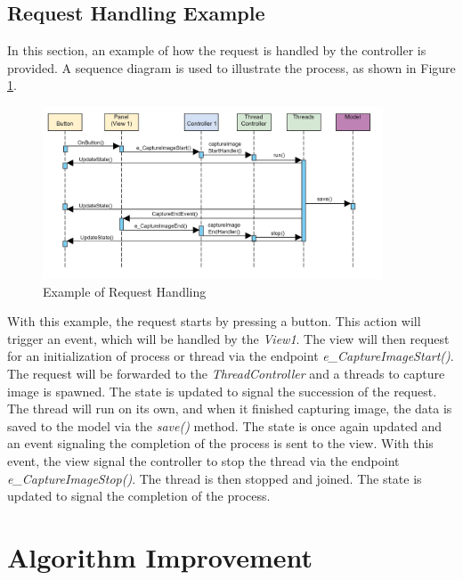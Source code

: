 \subsection{Request Handling Example}
\label{subsec:request_handling_example}

In this section, an example of how the request is handled by the controller is provided. A sequence diagram is used to illustrate the process, as shown in Figure \ref{fig:sequence_diagram}.

\begin{figure}[!ht]
    \centering
    \includegraphics[width=0.9\textwidth]{texs/Part2/chapter4/image/sequence.jpg}
    \caption{Example of Request Handling}
    \label{fig:sequence_diagram}
\end{figure}

With this example, the request starts by pressing a button. This action will trigger an event, which will be handled by the \textit{View1}. The view will then request for an initialization of process or thread via the endpoint \textit{e\_CaptureImageStart()}. The request will be forwarded to the \textit{ThreadController} and a threads to capture image is spawned. The state is updated to signal the succession of the request. The thread will run on its own, and when it finished capturing image, the data is saved to the model via the \textit{save()} method. The state is once again updated and an event signaling the completion of the process is sent to the view. With this event, the view signal the controller to stop the thread via the endpoint \textit{e\_CaptureImageStop()}. The thread is then stopped and joined. The state is updated to signal the completion of the process.

\section{Algorithm Improvement}
\label{sec:algorithm_improvement}

